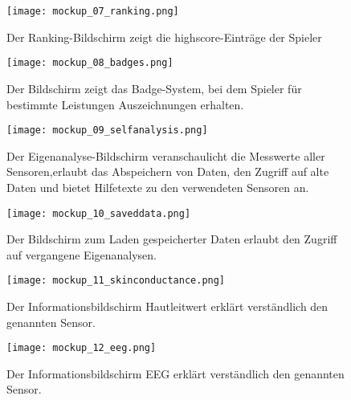 	\newpage
	\begin{figure}[ht!]
		\begin{center}
			\texttt{[image: mockup\_07\_ranking.png]}
		\end{center}
		\caption[Mockup highscore-Bildschirm]{Der Ranking-Bildschirm zeigt die highscore-Einträge der Spieler}
		\label{fig:mockup_07}
	\end{figure}	
	\begin{figure}[h!]
		\begin{center}
			\texttt{[image: mockup\_08\_badges.png]}
		\end{center}
		\caption[Mockup Badge-Bildschirm]{Der Bildschirm zeigt das Badge-System, bei dem Spieler für bestimmte Leistungen Auszeichnungen erhalten.}
		\label{fig:mockup_08}
	\end{figure}	

	\newpage
	\begin{figure}[ht!]
		\begin{center}
			\texttt{[image: mockup\_09\_selfanalysis.png]}
		\end{center}
		\caption[Mockup Bildschirm Eigenanalyse]{Der Eigenanalyse-Bildschirm veranschaulicht die Messwerte aller Sensoren,erlaubt das Abspeichern von Daten, den Zugriff auf alte Daten und bietet Hilfetexte zu den verwendeten Sensoren an.}
		\label{fig:mockup_09}
	\end{figure}	
	\begin{figure}[h!]
		\begin{center}
			\texttt{[image: mockup\_10\_saveddata.png]}
		\end{center}
		\caption[Mockup Bildschirm zum Laden gespeicherter Daten]{Der Bildschirm zum Laden gespeicherter Daten erlaubt den Zugriff auf vergangene Eigenanalysen.}
		\label{fig:mockup_10}
	\end{figure}	
	
	\newpage
	\begin{figure}[ht!]
		\begin{center}
			\texttt{[image: mockup\_11\_skinconductance.png]}
		\end{center}
		\caption[Mockup Infobildschirm Hautleitwert]{Der Informationsbildschirm Hautleitwert erklärt verständlich den genannten Sensor.}
		\label{fig:mockup_11}
	\end{figure}	
	\begin{figure}[h!]
		\begin{center}
			\texttt{[image: mockup\_12\_eeg.png]}
		\end{center}
		\caption[Mockup Infobildschirm EEG]{Der Informationsbildschirm EEG erklärt verständlich den genannten Sensor.}
		\label{fig:mockup_12}
	\end{figure}	

